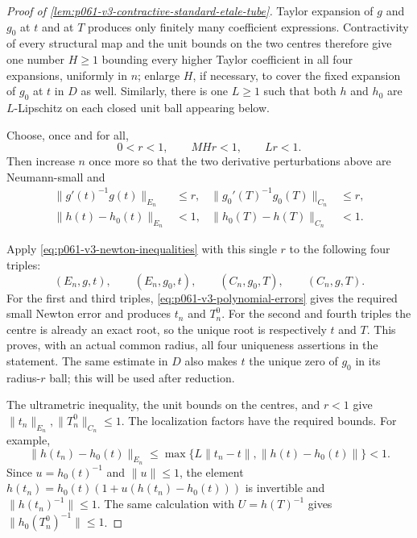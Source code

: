 \begin{proof}[Proof of
\cref{lem:p061-v3-contractive-standard-etale-tube}]
Taylor expansion of \(g\) and \(g_0\) at \(t\) and at \(T\) produces
only finitely many coefficient expressions. Contractivity of every
structural map and the unit bounds on the two centres therefore give one
number \(H\geq1\) bounding every higher Taylor coefficient in all four
expansions, uniformly in \(n\); enlarge \(H\), if necessary, to cover the
fixed expansion of \(g_0\) at \(t\) in \(D\) as well. Similarly, there is
one \(L\geq1\) such
that both \(h\) and \(h_0\) are \(L\)-Lipschitz on each closed unit ball
appearing below.

Choose, once and for all,
\begin{equation}\label{eq:p061-v3-common-radius}
          0<r<1,
 \qquad M H r<1,
 \qquad Lr<1.
\end{equation}
Then increase \(n\) once more so that the two derivative perturbations
above are Neumann-small and
\begin{equation}\label{eq:p061-v3-common-error-bound}
 \begin{aligned}
 \|g'(t)^{-1}g(t)\|_{E_n}&\leq r,&
 \|g_0'(T)^{-1}g_0(T)\|_{C_n}&\leq r,\\
 \|h(t)-h_0(t)\|_{E_n}&<1,&
 \|h_0(T)-h(T)\|_{C_n}&<1.
 \end{aligned}
\end{equation}

Apply \eqref{eq:p061-v3-newton-inequalities} with this single \(r\) to
the following four triples:
\[
 (E_n,g,t),
 \qquad (E_n,g_0,t),
 \qquad (C_n,g_0,T),
 \qquad (C_n,g,T).
\]
For the first and third triples, \eqref{eq:p061-v3-polynomial-errors}
gives the required small Newton error and produces \(t_n\) and \(T_n^0\).
For the second and fourth triples the centre is already an exact root, so
the unique root is respectively \(t\) and \(T\). This proves, with an
actual common radius, all four uniqueness assertions in the statement.
The same estimate in \(D\) also makes \(t\) the unique zero of \(g_0\)
in its radius-\(r\) ball; this will be used after reduction.

The ultrametric inequality, the unit bounds on the centres, and \(r<1\)
give \(\|t_n\|_{E_n},\|T_n^0\|_{C_n}\leq1\). The localization factors have
the required bounds. For example,
\[
 \|h(t_n)-h_0(t)\|_{E_n}
 \leq\max\bigl\{L\|t_n-t\|,
                  \|h(t)-h_0(t)\|\bigr\}<1.
\]
Since \(u=h_0(t)^{-1}\) and \(\|u\|\leq1\), the element
\(h(t_n)=h_0(t)(1+u(h(t_n)-h_0(t)))\) is invertible and
\(\|h(t_n)^{-1}\|\leq1\). The same calculation with
\(U=h(T)^{-1}\) gives \(\|h_0(T_n^0)^{-1}\|\leq1\).


\end{proof}
